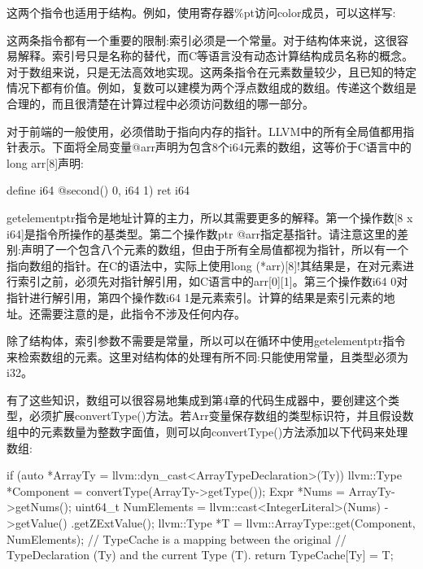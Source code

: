 这两个指令也适用于结构。例如，使用寄存器\%pt访问color成员，可以这样写:

\begin{shell}
\end{shell}

这两条指令都有一个重要的限制:索引必须是一个常量。对于结构体来说，这很容易解释。索引号只是名称的替代，而C等语言没有动态计算结构成员名称的概念。对于数组来说，只是无法高效地实现。这两条指令在元素数量较少，且已知的特定情况下都有价值。例如，复数可以建模为两个浮点数组成的数组。传递这个数组是合理的，而且很清楚在计算过程中必须访问数组的哪一部分。

对于前端的一般使用，必须借助于指向内存的指针。LLVM中的所有全局值都用指针表示。下面将全局变量@arr声明为包含8个i64元素的数组，这等价于C语言中的long arr[8]声明:

\begin{shell}
define i64 @second() {
    0, i64 1)
    ret i64 %
}
\end{shell}

getelementptr指令是地址计算的主力，所以其需要更多的解释。第一个操作数[8 x i64]是指令所操作的基类型。第二个操作数ptr @arr指定基指针。请注意这里的差别:声明了一个包含八个元素的数组，但由于所有全局值都视为指针，所以有一个指向数组的指针。在C的语法中，实际上使用long (*arr)[8]!其结果是，在对元素进行索引之前，必须先对指针解引用，如C语言中的arr[0][1]。第三个操作数i64 0对指针进行解引用，第四个操作数i64 1是元素索引。计算的结果是索引元素的地址。还需要注意的是，此指令不涉及任何内存。

除了结构体，索引参数不需要是常量，所以可以在循环中使用getelementptr指令来检索数组的元素。这里对结构体的处理有所不同:只能使用常量，且类型必须为i32。

有了这些知识，数组可以很容易地集成到第4章的代码生成器中，要创建这个类型，必须扩展convertType()方法。若Arr变量保存数组的类型标识符，并且假设数组中的元素数量为整数字面值，则可以向convertType()方法添加以下代码来处理数组:

\begin{cpp}
if (auto *ArrayTy =
            llvm::dyn_cast<ArrayTypeDeclaration>(Ty)) {
    llvm::Type *Component =
        convertType(ArrayTy->getType());
    Expr *Nums = ArrayTy->getNums();
    uint64_t NumElements =
        llvm::cast<IntegerLiteral>(Nums)
            ->getValue()
            .getZExtValue();
    llvm::Type *T =
        llvm::ArrayType::get(Component, NumElements);
    // TypeCache is a mapping between the original
    // TypeDeclaration (Ty) and the current Type (T).
    return TypeCache[Ty] = T;
}
\end{cpp}

